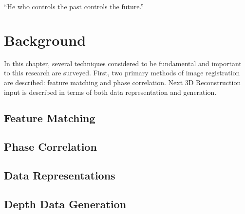 \begin{savequote}[8cm]
  ``He who controls the past controls the future.''
\end{savequote}
\makeatletter
\chapter{Background}

In this chapter, several techniques considered to be fundamental and important to this research are surveyed. First, two primary methods of image registration are described: feature matching and phase correlation. Next 3D Reconstruction input is described in terms of both data representation and generation.

\section{Feature Matching}

\section{Phase Correlation}

\section{Data Representations}

\section{Depth Data Generation}
\label{DepthDataGenSection}

